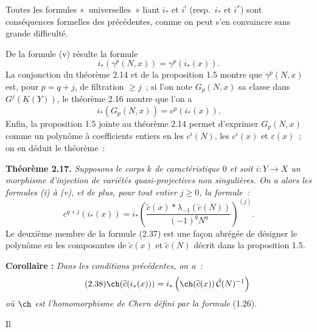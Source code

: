 Toutes les formules «~universelles~» liant $i_*$ et $i^!$ (resp.\ $i_*$ et $i^*$) sont conséquences formelles des précédentes, comme on peut s'en convaincre sans grande difficulté.

De la formule (v) résulte la formule
\[
 i_*(\gamma^p(N,x))=\gamma^p(i_*(x)).
\]
La conjonction du théorème 2.14 et de la proposition 1.5 montre que $\gamma^p(N,x)$ est, pour $p=q+j$, de filtration $\geq j$~; si l'on note $G_p(N,x)$ sa classe dans $G^j(\underline K(Y))$, le théorème 2.16 montre que l'on a
\[
 i_*(G_p(N,x))=c^p(i_*(x)).
\]
Enfin, la proposition 1.5 jointe au théorème 2.14 permet d'exprimer $G_p(N,x)$ comme un polynôme à coefficients entiers en les $c^i(N)$, les $c^i(x)$ et $\varepsilon(x)$~; on en déduit le théorème~:

\textbf{Théorème 2.17.} \emph{Supposons le corps $k$ de caractéristique $0$ et soit $i:Y\longrightarrow X$ un morphisme d'injection de variétés quasi-projectives non singulières. On a alors les formules (i) à (v), et de plus, pour tout entier $j\geq0$, la formule~:}
\begin{equation}\tag{2.37}
 c^{q+j}(i_*(x))=i_*\left(\frac{\widetilde c(x)*\lambda_{-1}(\widetilde c(N))}{(-1)^qN^q}\right)^{(j)}.
\end{equation}
Le deuxième membre de la formule (2.37) est une façon abrégée de désigner le polynôme en les composantes de $\widetilde c(x)$ et $\widetilde c(N)$ décrit dans la proposition 1.5.

\textbf{Corollaire :} \emph{Dans les conditions précédentes, on a~:}
\begin{equation}\tag{2.38}
 \ch(\widetilde c(i_*(x)))=i_*\left(\ch(\widetilde c(x))\,\check{\mathcal C}(N)^{-1}\right)
\end{equation}
\emph{où $\ch$ est l'homomorphisme de Chern défini par la formule} (1.26).

Il
